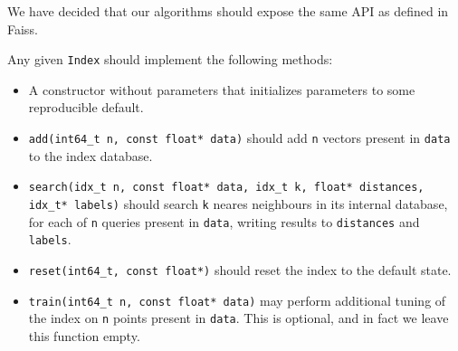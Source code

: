 We have decided that our algorithms should expose the same API as defined in Faiss.

Any given \texttt{Index} should implement the following methods:
\begin{itemize}

\item A constructor without parameters that initializes parameters to some reproducible default.

\item \texttt{add(int64\_t n, const float* data)} 
should add \texttt{n} vectors present in \texttt{data} to the index database.

\item \texttt{search(idx\_t n, const float* data, idx\_t k, float* distances, idx\_t* labels)} 
should search \texttt{k} neares neighbours 
in its internal database, for each of \texttt{n} queries present in \texttt{data}, writing results to \texttt{distances} and \texttt{labels}.

\item \texttt{reset(int64\_t, const float*)} 
should reset the index to the default state.

\item \texttt{train(int64\_t n, const float* data)} 
may perform additional tuning of the index on \texttt{n} points present in \texttt{data}. This is
optional, and in fact we leave this function empty.

\end{itemize}
